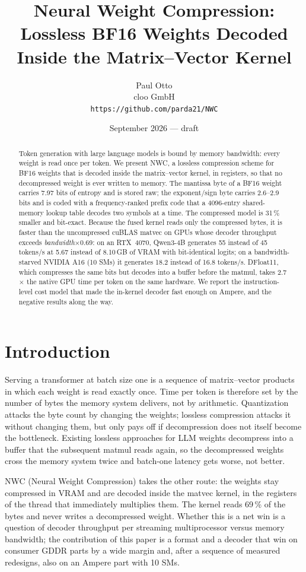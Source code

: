 \documentclass[11pt]{article}
\title{Neural Weight Compression: Lossless BF16 Weights Decoded Inside the Matrix--Vector Kernel}
\author{Paul Otto\\ cloo GmbH\\ \texttt{https://github.com/parda21/NWC}}
\date{September 2026 --- draft}
\begin{document}
\maketitle

\begin{abstract}
Token generation with large language models is bound by memory bandwidth: every weight is read once per
token. We present NWC, a lossless compression scheme for BF16 weights that is decoded inside the
matrix--vector kernel, in registers, so that no decompressed weight is ever written to memory. The
mantissa byte of a BF16 weight carries 7.97 bits of entropy and is stored raw; the exponent/sign byte
carries 2.6--2.9 bits and is coded with a frequency-ranked prefix code that a 4096-entry shared-memory
lookup table decodes two symbols at a time. The compressed model is 31\,\% smaller and bit-exact.
Because the fused kernel reads only the compressed bytes, it is faster than the uncompressed cuBLAS
matvec on GPUs whose decoder throughput exceeds \emph{bandwidth}$\times$0.69: on an RTX~4070, Qwen3-4B
generates 55 instead of 45 tokens/s at 5.67 instead of 8.10\,GB of VRAM with bit-identical logits; on a
bandwidth-starved NVIDIA A16 (10 SMs) it generates 18.2 instead of 16.8 tokens/s. DFloat11, which
compresses the same bits but decodes into a buffer before the matmul, takes 2.7$\times$ the native GPU
time per token on the same hardware. We report the instruction-level cost model that made the in-kernel
decoder fast enough on Ampere, and the negative results along the way.
\end{abstract}

\section{Introduction}

Serving a transformer at batch size one is a sequence of matrix--vector products in which each weight is
read exactly once. Time per token is therefore set by the number of bytes the memory system delivers, not
by arithmetic. Quantization attacks the byte count by changing the weights; lossless compression attacks
it without changing them, but only pays off if decompression does not itself become the bottleneck.
Existing lossless approaches for LLM weights \cite{dfloat11,zipnn} decompress into a buffer that the
subsequent matmul reads again, so the decompressed weights cross the memory system twice and batch-one
latency gets worse, not better.

NWC (Neural Weight Compression) takes the other route: the weights stay compressed in VRAM and are
decoded inside the matvec kernel, in the registers of the thread that immediately multiplies them. The
kernel reads 69\,\% of the bytes and never writes a decompressed weight. Whether this is a net win is a
question of decoder throughput per streaming multiprocessor versus memory bandwidth; the contribution of
this paper is a format and a decoder that win on consumer GDDR parts by a wide margin and, after a
sequence of measured redesigns, also on an Ampere part with 10 SMs.
\end{document}
